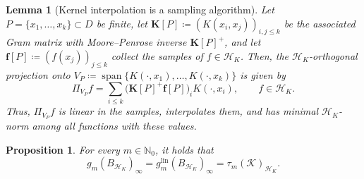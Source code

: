 \documentclass[10pt,a4paper]{amsart}
\newtheorem{lemma}{Lemma}
\newtheorem{proposition}{Proposition}
\newcommand{\N}{\mathbb{N}}
\newcommand{\lin}{\ensuremath{\mathrm{lin}}}
\DeclareMathOperator{\spann}{span}
\begin{document}
\begin{lemma}[Kernel interpolation is a sampling algorithm]\label{lem:interp}
Let $P=\{x_1,\dots,x_k\}\subset D$ be finite, let $\mathbf K[P]\coloneqq(K(x_i,x_j))_{i,j\le k}$ be the associated Gram matrix with Moore--Penrose inverse $\mathbf K[P]^{+}$, and let $\mathbf f[P]\coloneqq(f(x_j))_{j\le k}$ collect the samples of $f\in\mathcal H_K$.
Then, the $\mathcal H_K$-orthogonal projection onto $V_P \coloneqq \spann\{K(\cdot,x_1),\ldots, K(\cdot,x_k)\}$ is given by
\begin{equation}\label{eq:interp}
    \Pi_{V_P}f=\sum_{i\le k}\bigl(\mathbf K[P]^{+}\mathbf f[P]\bigr)_i K(\cdot,x_i), \qquad f\in\mathcal H_K .
\end{equation}
Thus, $\Pi_{V_P}f$ is linear in the samples, interpolates them, and has minimal $\mathcal H_K$-norm among all functions with these values.
\end{lemma}

\begin{proposition}\label{prop:gm}
For every $m\in\N_0$, it holds that
\begin{equation}\label{eq:chain_prop_gm}
    g_m(B_{\mathcal H_K})_\infty = g_m^{\lin}(B_{\mathcal H_K})_\infty = \tau_m(\mathcal{K})_{\mathcal{H}_K}.
\end{equation}
\end{proposition}
\end{document}
